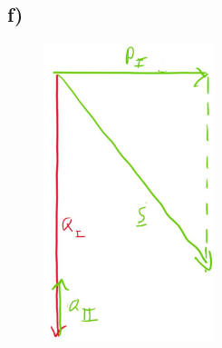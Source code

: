 \documentclass[../../document.tex]{subfiles}
\begin{document}
\subsection*{f)}

\begin{figure}[H]
    \begin{center}
        \includegraphics[width=5cm]{../../img/task1-f.jpeg}
    \end{center}
\end{figure}
\end{document}
